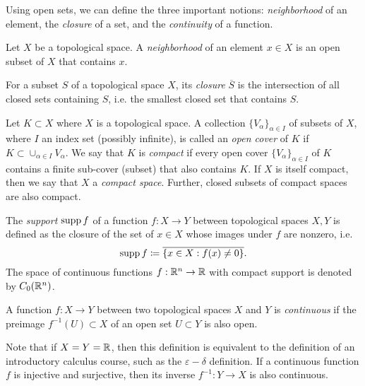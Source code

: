 Using open sets, we can define the three important notions: \emph{neighborhood} of an element, the \emph{closure} of a set, and the \emph{continuity} of a function.
\begin{definition}[Neighborhood]
    Let $X$ be a topological space. A \emph{neighborhood} of an element $x\in X$ is an open subset of $X$ that contains $x$. 
\end{definition}
\begin{definition}[Closure]
    For a subset $S$ of a topological space $X$, its \emph{closure} $\overline{S}$ is the intersection of all closed sets containing $S$, i.e. the smallest closed set that contains $S$.
\end{definition}
\begin{definition}[Compactness]
    Let $K\subset X$ where $X$ is a topological space. A collection $\{V_\alpha\}_{\alpha\in I}$ of subsets of $X$, where $I$ an index set (possibly infinite), is called an \emph{open cover} of $K$ if $K\subset \cup_{\alpha\in I}V_\alpha$. We say that $K$ is \emph{compact} if every open cover $\{V_\alpha\}_{\alpha\in I}$ of $K$ contains a finite sub-cover (subset) that also contains $K$. If $X$ is itself compact, then we say that $X$ a \emph{compact space}. Further, closed subsets of compact spaces are also compact.
\end{definition}
\begin{definition}
    The \emph{support} $\operatorname{\text{supp}} f$ of a function $f:X\to Y$ between topological spaces $X, Y$ is defined as the closure of the set of $x\in X$ whose images under $f$ are nonzero, i.e.
    \begin{equation}
        \operatorname{\text{supp}} f \coloneqq \overline{\{x\in X: f(x)\neq 0\}}.
    \end{equation}
    The space of continuous functions $f:\mathbb{R}^n \to \mathbb{R}$ with compact support is denoted by $C_0(\mathbb{R}^n)$.
\end{definition}
\begin{definition}[Continuity]\label{def:continuity-topological}
    A function $f:X\to Y$ between two topological spaces $X$ and $Y$ is \emph{continuous} if the preimage $f^{-1}(U)\subset X$ of an open set $U\subset Y$ is also open. 
\end{definition}
Note that if $X=Y=\mathbb{R}$, then this definition is equivalent to the definition of an introductory calculus course, such as the $\varepsilon-\delta$ definition. If a continuous function $f$ is injective and surjective, then its inverse $f^{-1}:Y\to X$ is also continuous.
